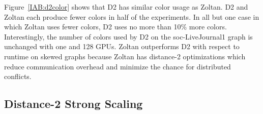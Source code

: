 Figure~\ref{IAB:d2color} shows that D2 has similar color usage as Zoltan.
D2 and Zoltan each produce fewer colors in half of the experiments.
In all but one case in which Zoltan uses fewer colors, D2 uses no more than 10\% more colors.
Interestingly, the number of colors used by D2 on the soc-LiveJournal1 graph is unchanged with one and 128 GPUs.
Zoltan outperforms D2 with respect to runtime on skewed graphs because Zoltan has distance-2 optimizations which reduce communication overhead
and minimize the chance for distributed conflicts.

\subsection{Distance-2 Strong Scaling}


